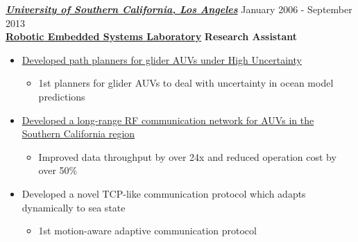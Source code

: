 \vspace{8pt}
{\sl \href{http://www.usc.edu}{\textbf{University of Southern California, Los Angeles}}} \hfill        January 2006 - September 2013 \\
\href{http://robotics.usc.edu/resl}{\textbf{Robotic Embedded Systems Laboratory}}       \hfill   \textbf{Research Assistant}
   \begin{itemize} \itemsep -2pt
   \item \href{http://robotics.usc.edu/~ampereir/wordpress/?page_id=131}{Developed  path planners for glider AUVs under High Uncertainty} \itemsep -2pt
   \begin{itemize}\item[$\checkmark$]  \itemsep -8pt%
    1st planners for glider AUVs to deal with uncertainty in ocean model predictions 
    \iftoggle{detailedVersion}
    {\begin{itemize}\item[\tiny$\blacksquare$] Combines techniques from AI, Machine Learning and Robotics
   \item[\tiny$\blacksquare$] All code written in C++ and Python (STL, Boost, NumPy/SciPy)
   \item[\tiny$\blacksquare$] Used hardware parallelization and advanced data structures to speed up computations
    \end{itemize}
   } {}
   \end{itemize}
    
   \item \href{http://robotics.usc.edu/~ampereir/wordpress/?page_id=134}{Developed a long-range RF communication network for AUVs in the Southern California region}
   \begin{itemize} \item[$\checkmark$]Improved data throughput by over 24x and reduced operation cost by over 50\%
   \iftoggle{detailedVersion}{\begin{itemize}
   \item[\tiny$\blacksquare$]  Required Computer Networking, Embedded Systems and Signal Processing
   \item[\tiny$\blacksquare$]  All code written in C++ (both ARM and PC-based Linux) 
   \end{itemize}}{}
   \end{itemize}
   
    \item Developed a novel TCP-like communication protocol which adapts dynamically to sea state
   \begin{itemize} \item[$\checkmark$]1st motion-aware adaptive communication protocol
   \iftoggle{detailedVersion}{\begin{itemize}
   \item[\tiny$\blacksquare$]  Required Computer Networking, Reinforcement Learning and Signal Processing
   \item[\tiny$\blacksquare$]  All code written in C++ (both ARM and PC-based Linux) 
   \end{itemize}}{}
   \end{itemize}
   

\end{itemize}
